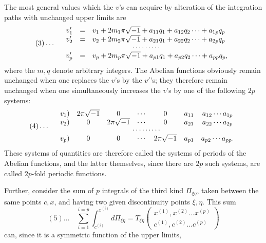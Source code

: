 \documentclass[10pt]{article}
\begin{document}
The most general values which the \(v\)'s can acquire by alteration of the integration paths with unchanged upper limits are
\[
(3)\ldots\quad
\begin{array}{rcl}
v_1'&=&v_1+2m_1\pi\sqrt{-1}+a_{11}q_1+a_{12}q_2\cdots+a_{1p}q_p\\
v_2'&=&v_2+2m_2\pi\sqrt{-1}+a_{21}q_1+a_{22}q_2\cdots+a_{2p}q_p\\[-0.15em]
\multicolumn{3}{c}{\cdots\cdots\cdots}\\
v_p'&=&v_p+2m_p\pi\sqrt{-1}+a_{p1}q_1+a_{p2}q_2\cdots+a_{pp}q_p,
\end{array}
\]
where the \(m,q\) denote arbitrary integers. The Abelian functions obviously remain unchanged when one replaces the \(v\)'s by the \(v'\)'s; they therefore remain unchanged when one simultaneously increases the \(v\)'s by one of the following \(2p\) systems:
\[
(4)\ldots\quad
\begin{array}{rcccccc}
v_1)&2\pi\sqrt{-1}&0&\cdots&0&a_{11}&a_{12}\cdots a_{1p}\\
v_2)&0&2\pi\sqrt{-1}&\cdots&0&a_{21}&a_{22}\cdots a_{2p}\\[-0.15em]
\multicolumn{7}{c}{\cdots\cdots\cdots}\\
v_p)&0&0&\cdots&2\pi\sqrt{-1}&a_{p1}&a_{p2}\cdots a_{pp}.
\end{array}
\]
These systems of quantities are therefore called the systems of periods of the Abelian functions, and the latter themselves, since there are \(2p\) such systems, are called \(2p\)-fold periodic functions.

Further, consider the sum of \(p\) integrals of the third kind \(\Pi_{\xi\eta}\), taken between the same points \(c,x\), and having two given discontinuity points \(\xi,\eta\). This sum
\[
(5)\ldots\quad
\sum_{i=1}^{i=p}\int_{c^{(i)}}^{x^{(i)}}d\Pi_{\xi\eta}
=T_{\xi\eta}\begin{pmatrix}x^{(1)},x^{(2)}\ldots x^{(p)}\\ c^{(1)},c^{(2)}\ldots c^{(p)}\end{pmatrix}
\]
can, since it is a symmetric function of the upper limits,



\small

\end{document}

